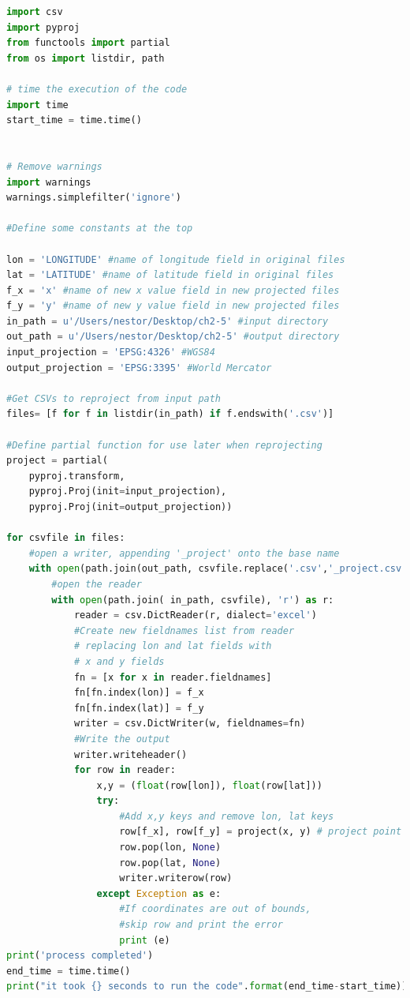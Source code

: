 \documentclass[a4paper , 12pt]{book}
\begin{document}
\begin{center}
\begin{lstlisting}[language=Python, frame=single]
import csv
import pyproj
from functools import partial
from os import listdir, path

# time the execution of the code
import time
start_time = time.time()


# Remove warnings
import warnings
warnings.simplefilter('ignore')

#Define some constants at the top

lon = 'LONGITUDE' #name of longitude field in original files
lat = 'LATITUDE' #name of latitude field in original files
f_x = 'x' #name of new x value field in new projected files
f_y = 'y' #name of new y value field in new projected files
in_path = u'/Users/nestor/Desktop/ch2-5' #input directory
out_path = u'/Users/nestor/Desktop/ch2-5' #output directory
input_projection = 'EPSG:4326' #WGS84
output_projection = 'EPSG:3395' #World Mercator

#Get CSVs to reproject from input path
files= [f for f in listdir(in_path) if f.endswith('.csv')]

#Define partial function for use later when reprojecting
project = partial(
    pyproj.transform,
    pyproj.Proj(init=input_projection),
    pyproj.Proj(init=output_projection))

for csvfile in files:
    #open a writer, appending '_project' onto the base name
    with open(path.join(out_path, csvfile.replace('.csv','_project.csv')), 'w') as w:
        #open the reader
        with open(path.join( in_path, csvfile), 'r') as r:
            reader = csv.DictReader(r, dialect='excel')
            #Create new fieldnames list from reader
            # replacing lon and lat fields with 
            # x and y fields
            fn = [x for x in reader.fieldnames]
            fn[fn.index(lon)] = f_x
            fn[fn.index(lat)] = f_y
            writer = csv.DictWriter(w, fieldnames=fn)
            #Write the output
            writer.writeheader()
            for row in reader:
                x,y = (float(row[lon]), float(row[lat]))
                try:
                    #Add x,y keys and remove lon, lat keys
                    row[f_x], row[f_y] = project(x, y) # project point
                    row.pop(lon, None)
                    row.pop(lat, None)
                    writer.writerow(row)
                except Exception as e:
                    #If coordinates are out of bounds, 
                    #skip row and print the error
                    print (e)
print('process completed')
end_time = time.time()
print("it took {} seconds to run the code".format(end_time-start_time))
\end{lstlisting}
\end{center}
\end{document}
